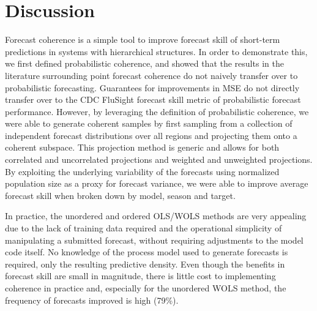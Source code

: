\documentclass{umassthesis}          %
\begin{document}
 
\section{Discussion}
   
   Forecast coherence is a simple tool to improve forecast skill of short-term predictions in systems with hierarchical structures. In order to demonstrate this, we first defined probabilistic coherence, and showed that the results in the literature surrounding point forecast coherence do not naively transfer over to probabilistic forecasting. Guarantees for improvements in MSE do not directly transfer over to the CDC FluSight forecast skill metric of probabilistic forecast performance. However, by leveraging the definition of probabilistic coherence, we were able to generate coherent samples by first sampling from a collection of independent forecast distributions over all regions and projecting them onto a coherent subspace. This projection method is generic and allows for both correlated and uncorrelated projections and weighted and unweighted projections. By exploiting the underlying variability of the forecasts using normalized population size as a proxy for forecast variance, we were able to improve average forecast skill when broken down by model, season and target.
   
   In practice, the unordered and ordered OLS/WOLS methods are very appealing due to the lack of training data required and the operational simplicity of manipulating a submitted forecast, without requiring adjustments to the model code itself. No knowledge of the process model used to generate forecasts is required, only the resulting predictive density. Even though the benefits in forecast skill are small in magnitude, there is little cost to implementing coherence in practice and, especially for the unordered WOLS method, the frequency of forecasts improved is high (79\%).
   
\end{document}
